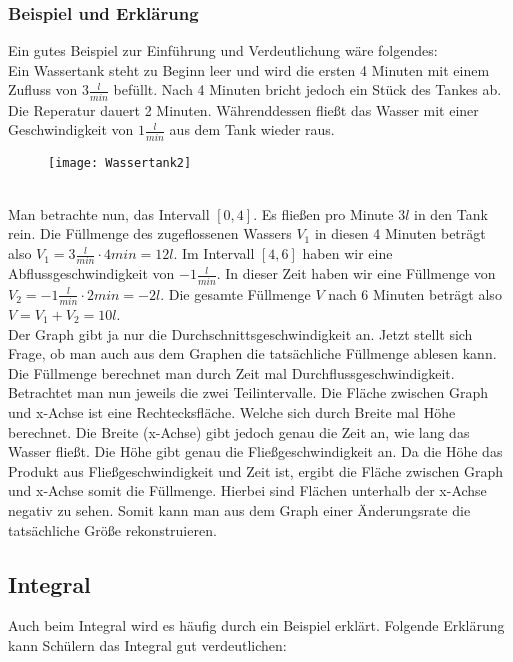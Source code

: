 \documentclass[a4paper]{article}
\begin{document}
\subsubsection{Beispiel und Erklärung}
Ein gutes Beispiel zur Einführung und Verdeutlichung wäre folgendes: \\
Ein Wassertank steht zu Beginn leer und wird die ersten 4 Minuten mit einem Zufluss von $3 \frac{l}{min}$ befüllt. Nach 4 Minuten bricht jedoch ein Stück des Tankes ab. Die Reperatur dauert 2 Minuten. Währenddessen fließt das Wasser mit einer Geschwindigkeit von $1 \frac{l}{min}$ aus dem Tank wieder raus.
\vspace*{1em} \\
\begin{figure} [h!]
\centering
\texttt{[image: Wassertank2]}
\end{figure}
\vspace{1em} \\
Man betrachte nun, das Intervall $[0,4]$. Es fließen pro Minute $3 l$ in den Tank rein. Die Füllmenge des zugeflossenen Wassers $V_1$ in diesen 4 Minuten beträgt also $V_1 = 3 \frac{l}{min} \cdot 4 min = 12 l$. Im Intervall $[4,6]$ haben wir eine Abflussgeschwindigkeit von $-1 \frac{l}{min}$. In dieser Zeit haben wir eine Füllmenge von $V_2 = -1 \frac{l}{min} \cdot 2 min = -2 l$. Die gesamte Füllmenge $V$ nach 6 Minuten beträgt also $V = V_1 + V_2  = 10 l$. \\
Der Graph gibt ja nur die Durchschnittsgeschwindigkeit an. Jetzt stellt sich Frage, ob man auch aus dem Graphen die tatsächliche Füllmenge ablesen kann. Die Füllmenge berechnet man durch Zeit mal Durchflussgeschwindigkeit. Betrachtet man nun jeweils die zwei Teilintervalle. Die Fläche zwischen Graph und x-Achse ist eine Rechtecksfläche. Welche sich durch Breite mal Höhe berechnet. Die Breite (x-Achse) gibt jedoch genau die Zeit an, wie lang das Wasser fließt. Die Höhe gibt genau die Fließgeschwindigkeit an. Da die Höhe das Produkt aus Fließgeschwindigkeit und Zeit ist, ergibt die Fläche zwischen Graph und x-Achse somit die Füllmenge. Hierbei sind Flächen unterhalb der x-Achse negativ zu sehen. Somit kann man aus dem Graph einer Änderungsrate die tatsächliche Größe rekonstruieren. 
\subsection{Integral}
Auch beim Integral wird es häufig durch ein Beispiel erklärt. Folgende Erklärung kann Schülern das Integral gut verdeutlichen:
\end{document}
